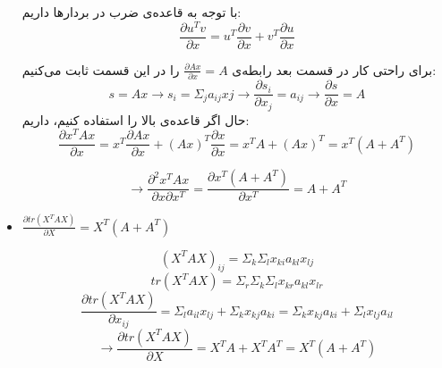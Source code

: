 \begin{itemize}
	با توجه به قاعده‌ی ضرب در بردارها داریم:
	$$\frac{\partial u^Tv}{\partial x} = u^T \frac{\partial v}{\partial x} + v^T \frac{\partial u}{\partial x}$$
	
	برای راحتی کار در قسمت بعد رابطه‌ی $\frac{\partial Ax}{\partial x} = A$ را در این قسمت ثابت می‌کنیم:
	$$
		s = Ax \rightarrow s_i = \Sigma_{j}a_{ij}xj \rightarrow \frac{\partial s_i}{\partial x_j} = a_{ij} \rightarrow \frac{\partial s}{\partial x} = A
	$$
حال اگر قاعده‌ی بالا را استفاده کنیم، داریم:
$$\frac{\partial x^TAx}{\partial x}
= x^T \frac{\partial Ax}{\partial x} + (Ax)^T \frac{\partial x}{\partial x} = x^TA + (Ax)^T = x^T(A + A^T)
$$ 

$$ \rightarrow \frac{\partial^2 x^TAx}{\partial x \partial x^T} = \frac{\partial x^T(A + A^T)}{\partial x^T} = A + A^T$$

\item $\frac{\partial tr(X^TAX)}{\partial X} = X^T(A + A^T)$ 

$$(X^TAX)_{ij} = \Sigma_{k}\Sigma_{l}x_{ki}a_{kl}x_{lj}$$
$$tr(X^TAX) = \Sigma_{r}\Sigma_{k}\Sigma_{l} x_{kr}a_{kl}x_{lr}$$
$$\frac{\partial tr(X^TAX)}{\partial x_{ij}} = \Sigma_{l}a_{il}x_{lj} + \Sigma_{k} x_{kj}a_{ki} = \Sigma_{k}x_{kj}a_{ki} + \Sigma_{l}x_{lj}a_{il}$$
$$\rightarrow \frac{\partial tr(X^TAX)}{\partial X} = X^TA + X^TA^T = X^T(A + A^T)$$
\end{itemize}